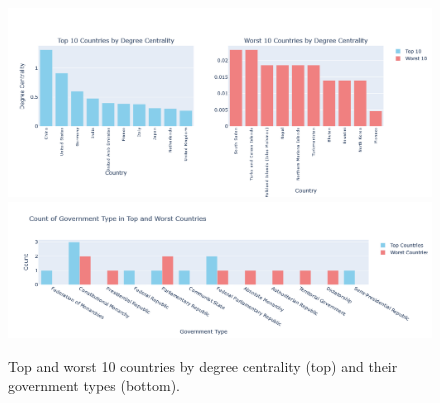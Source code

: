\documentclass[12pt, a4paper]{article}
\begin{document}
\begin{figure}[!ht]
\centering
\includegraphics[width=\textwidth]{figures/question1/figure_2a.png}
\vspace{1em}
\includegraphics[width=\textwidth]{figures/question1/figure_2b.png}
\captionsetup{font=scriptsize,labelfont=bf}
\caption{Top and worst 10 countries by degree centrality (top) and their government types (bottom).}
\label{fig:figure2}
\end{figure}

\end{document}
